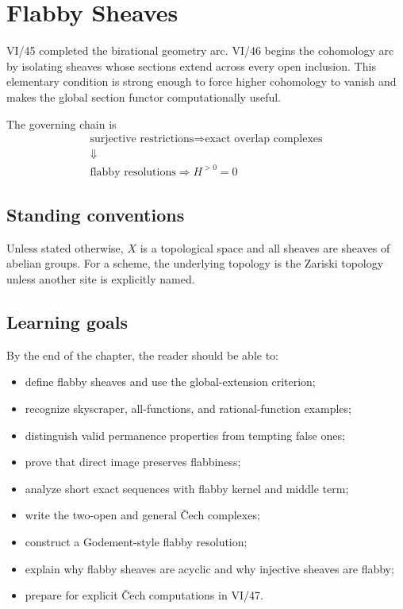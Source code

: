 \chapter{Flabby Sheaves}
\label{ch:vi46-flabby-sheaves}

VI/45 completed the birational geometry arc. VI/46 begins the cohomology arc by isolating sheaves whose sections extend across every open inclusion. This elementary condition is strong enough to force higher cohomology to vanish and makes the global section functor computationally useful.

The governing chain is
\[
\boxed{
\begin{gathered}
\text{surjective restrictions}
\Longrightarrow
\text{exact overlap complexes}\\
\Downarrow\\
\text{flabby resolutions}
\Longrightarrow
H^{>0}=0
\end{gathered}
}
\]

\section*{Standing conventions}
Unless stated otherwise, $X$ is a topological space and all sheaves are sheaves of abelian groups. For a scheme, the underlying topology is the Zariski topology unless another site is explicitly named.

\section*{Learning goals}
By the end of the chapter, the reader should be able to:
\begin{itemize}
\item define flabby sheaves and use the global-extension criterion;
\item recognize skyscraper, all-functions, and rational-function examples;
\item distinguish valid permanence properties from tempting false ones;
\item prove that direct image preserves flabbiness;
\item analyze short exact sequences with flabby kernel and middle term;
\item write the two-open and general \v{C}ech complexes;
\item construct a Godement-style flabby resolution;
\item explain why flabby sheaves are acyclic and why injective sheaves are flabby;
\item prepare for explicit \v{C}ech computations in VI/47.
\end{itemize}

